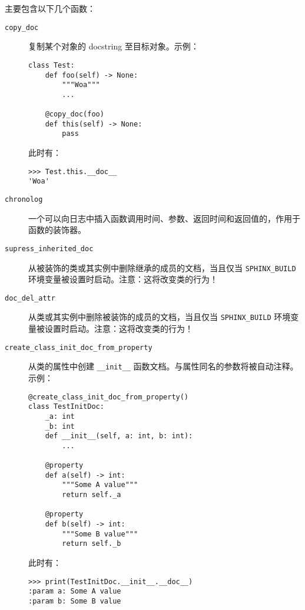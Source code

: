 \documentclass[pdf,9pt]{beamer}
\begin{document}
    \begin{frame}{\subsubsecname}
        主要包含以下几个函数：

        \begin{description}
            \item[\Verb|copy_doc|] 复制某个对象的 docstring 至目标对象。示例：
            \begin{verbatim}
class Test:
    def foo(self) -> None:
        """Woa"""
        ...

    @copy_doc(foo)
    def this(self) -> None:
        pass
            \end{verbatim}

            此时有：

            \begin{verbatim}
>>> Test.this.__doc__
'Woa'
            \end{verbatim}
        
            \item[\Verb|chronolog|] 一个可以向日志中插入函数调用时间、参数、返回时间和返回值的，作用于函数的装饰器。
            \item[\Verb|supress_inherited_doc|] 从被装饰的类或其实例中删除继承的成员的文档，当且仅当 \Verb|SPHINX_BUILD| 环境变量被设置时启动。注意：这将改变类的行为！ 
            \item[\Verb|doc_del_attr|] 从类或其实例中删除被装饰的成员的文档，当且仅当 \Verb|SPHINX_BUILD| 环境变量被设置时启动。注意：这将改变类的行为！ 
            \item[\Verb|create_class_init_doc_from_property|] 从类的属性中创建 \Verb|__init__| 函数文档。与属性同名的参数将被自动注释。示例：
            \begin{verbatim}
@create_class_init_doc_from_property()
class TestInitDoc:
    _a: int
    _b: int
    def __init__(self, a: int, b: int):
        ...

    @property
    def a(self) -> int:
        """Some A value"""
        return self._a

    @property
    def b(self) -> int:
        """Some B value"""
        return self._b
            \end{verbatim}

            此时有：

            \begin{verbatim}
>>> print(TestInitDoc.__init__.__doc__)
:param a: Some A value
:param b: Some B value

            \end{verbatim}
        \end{description}
    \end{frame}
\end{document}
